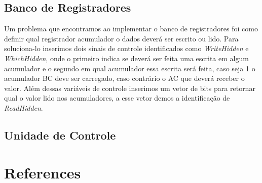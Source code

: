 \documentclass[12pt]{article}
\begin{document}
\subsection{Banco de Registradores}

Um problema que encontramos ao implementar o banco de registradores foi como definir qual registrador acumulador o dados deverá ser escrito ou lido. Para soluciona-lo inserimos dois sinais de controle identificados como \textit{WriteHidden} e \textit{WhichHidden}, onde o primeiro indica se deverá ser feita uma escrita em algum acumulador e o segundo em qual acumulador essa escrita será feita, caso seja 1 o acumulador BC deve ser carregado, caso contrário o AC que deverá receber o valor. Além dessas variáveis de controle inserimos um vetor de bits para retornar qual o valor lido nos acumuladores, a esse vetor demos a identificação de \textit{ReadHidden}.

\subsection{Unidade de Controle}



\section{References}



\end{document}
